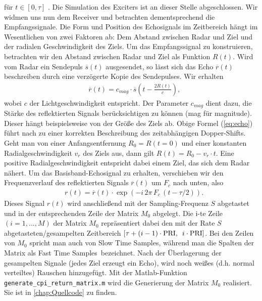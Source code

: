 %
für $ t \in [0, \tau] $ . Die Simulation des Exciters ist an dieser Stelle abgeschlossen. Wir widmen uns nun dem Receiver und betrachten dementsprechend die Empfangssignale. Die Form und Position des Echosignals im Zeitbereich hängt im Wesentlichen von zwei Faktoren ab: Dem Abstand zwischen Radar und Ziel und der radialen Geschwindigkeit des Ziels. Um das Empfangssignal zu konstruieren, betrachten wir den Abstand zwischen Radar und Ziel als Funktion $ R(t) $. Wird vom Radar ein Sendepuls $ \overline{s}(t) $ ausgesendet, so lässt sich das Echo $ \overline{r}(t) $ beschreiben durch eine verzögerte Kopie des Sendepulses. Wir erhalten 
%
\begin{eqnarray}
& \overline{r}(t) = c_{mag} \cdot \overline{s}(t - \frac{2 R(t)}{c}) \text{,}
\label{eq:echo}
\end{eqnarray}
%
wobei $ c $ der Lichtgeschwindigkeit entspricht. Der Parameter $ c_{mag} $ dient dazu, die Stärke des reflektierten Signals berücksichtigen zu können (mag für \glqq magnitude\grqq). Dieser hängt beispielsweise von der Größe des Ziels ab. Obige Formel (\ref{eq:echo}) führt nach \cite[Seite 95]{Richards} zu einer korrekten Beschreibung des zeitabhängigen Dopper-Shifts. Geht man von einer Anfangsentfernung $ R_0 = R(t=0) $ und einer konstanten Radialgeschwindigkeit $ v_{r} $ des Ziels aus, dann gilt $ R(t) = R_0 - v_r\cdot t $. Eine positive Radialgeschwindigkeit entspricht dabei einem Ziel, das sich dem Radar nähert. Um das Basisband-Echosignal zu erhalten, verschieben wir den Frequenzverlauf des reflektierten Signals $ \overline{r}(t) $ um $ F_c $ nach unten, also
%
\begin{eqnarray}
& r(t) = \overline{r}(t)\cdot \exp\left(- i \, 2 \pi \, F_{c} \, (t - \tau/2) \right) \text{.}
\end{eqnarray}
%
Dieses Signal $ r(t) $ wird anschließend mit der Sampling-Frequenz  $ S $ abgetastet und in der entsprechenden Zeile der Matrix $ M_0 $ abgelegt. Die i-te Zeile $ (i = 1,...,M) $ der Matrix $ M_0 $ repräsentiert dabei den mit der Rate $ S $ abgetasteten/gesampelten Zeitbereich $ [\tau + (i-1)\cdot \text{PRI}, \enskip i\cdot \text{PRI}] $. Bei den Zeilen von $ M_0 $ spricht man auch von \glqq Slow Time Samples\grqq , während man die Spalten der Matrix als \glqq Fast Time Samples\grqq ~bezeichnet. Nach der Überlagerung der gesampelten Signale (jedes Ziel erzeugt ein Echo), wird noch weißes (d.h. normal verteiltes) Rauschen hinzugefügt. Mit der Matlab-Funktion \texttt{generate\_{}cpi\_{}return\_{}matrix.m} wird die Generierung der Matrix $ M_0 $ realisiert. Sie ist in \cref{chap:Quellcode} zu finden.

